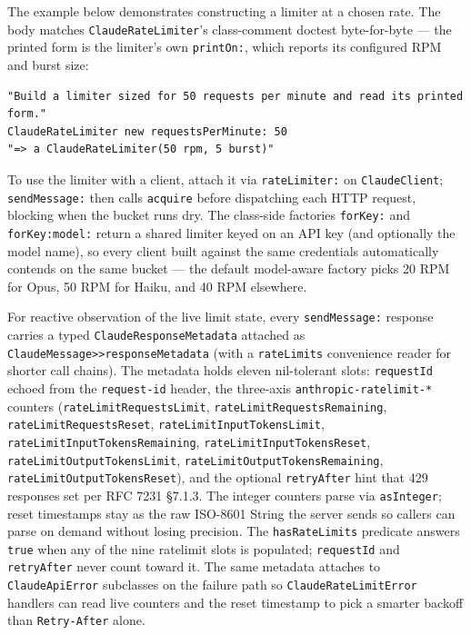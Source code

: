 \documentclass[a4paper,10pt,fleqn]{article}
\begin{document}
\begin{sloppypar}
The example below demonstrates constructing a limiter at a chosen
rate.  The body matches \texttt{ClaudeRateLimiter}'s class-comment
doctest byte-for-byte --- the printed form is the limiter's own
\texttt{printOn:}, which reports its configured RPM and burst size:
\end{sloppypar}

\begin{lstlisting}[language={}]
"Build a limiter sized for 50 requests per minute and read its printed form."
ClaudeRateLimiter new requestsPerMinute: 50
"=> a ClaudeRateLimiter(50 rpm, 5 burst)"
\end{lstlisting}

To use the limiter with a client, attach it via \texttt{rateLimiter:}
on \texttt{ClaudeClient}; \texttt{sendMessage:} then calls
\texttt{acquire} before dispatching each HTTP request, blocking when
the bucket runs dry.  The class-side factories
\texttt{forKey:} and \texttt{forKey:model:} return a shared limiter
keyed on an API key (and optionally the model name), so every client
built against the same credentials automatically contends on the
same bucket --- the default model-aware factory picks 20 RPM for
Opus, 50 RPM for Haiku, and 40 RPM elsewhere.

\begin{sloppypar}
For reactive observation of the live limit state, every
\texttt{sendMessage:} response carries a typed
\texttt{ClaudeResponseMetadata} attached as
\texttt{ClaudeMessage>>responseMetadata} (with a
\texttt{rateLimits} convenience reader for shorter call chains).
The metadata holds eleven nil-tolerant slots: \texttt{requestId}
echoed from the \texttt{request-id} header, the three-axis
\texttt{anthropic-ratelimit-*} counters
(\texttt{rateLimitRequestsLimit},
\texttt{rateLimitRequestsRemaining},
\texttt{rateLimitRequestsReset},
\texttt{rateLimitInputTokensLimit},
\texttt{rateLimitInputTokensRemaining},
\texttt{rateLimitInputTokensReset},
\texttt{rateLimitOutputTokensLimit},
\texttt{rateLimitOutputTokensRemaining},
\texttt{rateLimitOutputTokensReset}), and the optional
\texttt{retryAfter} hint that 429 responses set per RFC 7231 §7.1.3.
The integer counters parse via \texttt{asInteger}; reset timestamps
stay as the raw ISO-8601 String the server sends so callers can
parse on demand without losing precision.  The
\texttt{hasRateLimits} predicate answers \texttt{true} when any of
the nine ratelimit slots is populated; \texttt{requestId} and
\texttt{retryAfter} never count toward it.  The same metadata
attaches to \texttt{ClaudeApiError} subclasses on the failure path
so \texttt{ClaudeRateLimitError} handlers can read live counters and
the reset timestamp to pick a smarter backoff than
\texttt{Retry-After} alone.
\end{sloppypar}
\end{document}
